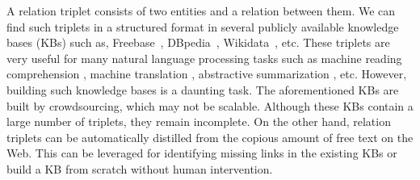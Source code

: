 

A relation triplet consists of two entities and a relation between them. We can find such triplets in a structured format in several publicly available knowledge bases (KBs) such as, Freebase~, DBpedia~, Wikidata~, etc. These triplets are very useful for many natural language processing tasks such as machine reading comprehension , machine translation , abstractive summarization , etc. However, building such knowledge bases is a daunting task. The aforementioned KBs are built by crowdsourcing, which may not be scalable. Although these KBs contain a large number of triplets, they remain incomplete. On the other hand, relation triplets can be automatically distilled from the copious amount of free text on the Web. This can be leveraged for identifying missing links in the existing KBs or build a KB from scratch without human intervention. 
